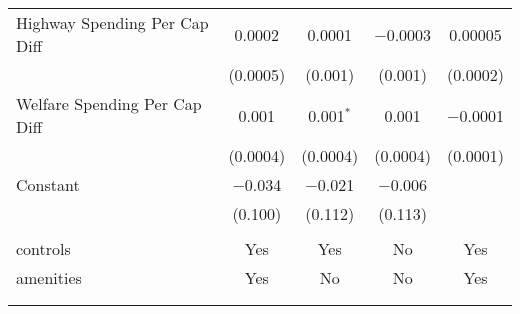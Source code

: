 \begin{table}[!htbp]
\begin{tabular}{@{\extracolsep{5pt}}lcccc}
  Highway Spending Per Cap Diff & 0.0002 & 0.0001 & $-$0.0003 & 0.00005 \\ 
  & (0.0005) & (0.001) & (0.001) & (0.0002) \\ 
  Welfare Spending Per Cap Diff & 0.001 & 0.001$^{*}$ & 0.001 & $-$0.0001 \\ 
  & (0.0004) & (0.0004) & (0.0004) & (0.0001) \\ 
  Constant & $-$0.034 & $-$0.021 & $-$0.006 &  \\ 
  & (0.100) & (0.112) & (0.113) &  \\ 
 \hline \\[-1.8ex] 
controls & Yes & Yes & No & Yes \\ 
amenities & Yes & No & No & Yes \\ 
\hline \\[-1.8ex] 
\hline 
\hline \\[-1.8ex] 
\end{tabular} 
\end{table} 
